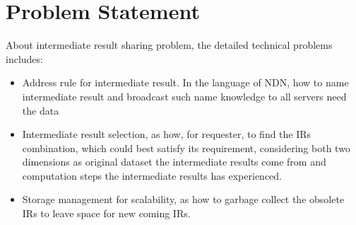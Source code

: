 \section{Problem Statement}

About intermediate result sharing problem, the detailed technical problems includes:
\begin{itemize}
\item Address rule for intermediate result. In the language of NDN, how to name intermediate result and broadcast such name knowledge to all servers need the data

\item Intermediate result selection, as how, for requester, to find the IRs combination, which could best satisfy its requirement, considering both two dimensions as original dataset the intermediate results come from and computation steps the intermediate results has experienced.

\item Storage management for scalability, as how to garbage collect the obsolete IRs to leave space for new coming IRs.   
\end{itemize}